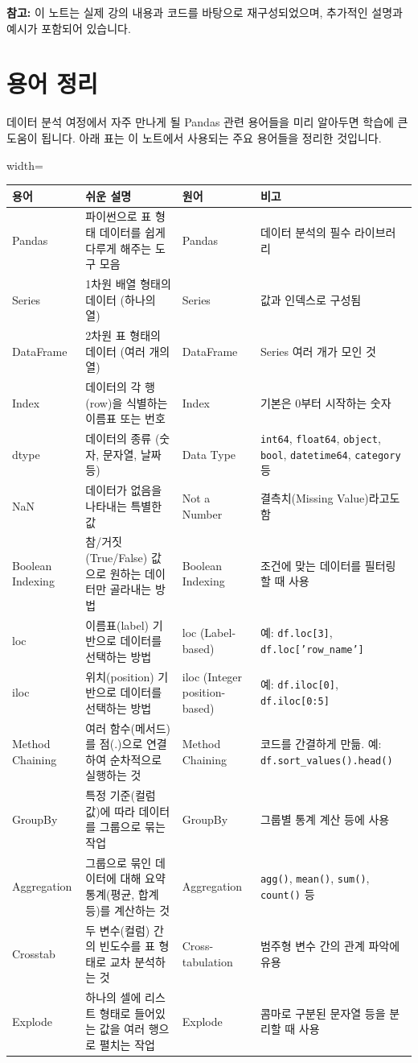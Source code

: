 \documentclass[11pt,a4paper]{book}
\theoremstyle{definition}
\begin{document}
\textbf{참고:} 이 노트는 실제 강의 내용과 코드를 바탕으로 재구성되었으며, 추가적인 설명과 예시가 포함되어 있습니다.


\section{용어 정리}

데이터 분석 여정에서 자주 만나게 될 Pandas 관련 용어들을 미리 알아두면 학습에 큰 도움이 됩니다. 아래 표는 이 노트에서 사용되는 주요 용어들을 정리한 것입니다.

\begin{adjustbox}{width=\textwidth}
\begin{tabular}{llll}
\toprule
\textbf{용어} & \textbf{쉬운 설명} & \textbf{원어} & \textbf{비고} \\
\midrule
Pandas & 파이썬으로 표 형태 데이터를 쉽게 다루게 해주는 도구 모음 & Pandas & 데이터 분석의 필수 라이브러리 \\
Series & 1차원 배열 형태의 데이터 (하나의 열) & Series & 값과 인덱스로 구성됨 \\
DataFrame & 2차원 표 형태의 데이터 (여러 개의 열) & DataFrame & Series 여러 개가 모인 것 \\
Index & 데이터의 각 행(row)을 식별하는 이름표 또는 번호 & Index & 기본은 0부터 시작하는 숫자 \\
dtype & 데이터의 종류 (숫자, 문자열, 날짜 등) & Data Type & \texttt{int64}, \texttt{float64}, \texttt{object}, \texttt{bool}, \texttt{datetime64}, \texttt{category} 등 \\
NaN & 데이터가 없음을 나타내는 특별한 값 & Not a Number & 결측치(Missing Value)라고도 함 \\
Boolean Indexing & 참/거짓(True/False) 값으로 원하는 데이터만 골라내는 방법 & Boolean Indexing & 조건에 맞는 데이터를 필터링할 때 사용 \\
loc & 이름표(label) 기반으로 데이터를 선택하는 방법 & loc (Label-based) & 예: \texttt{df.loc[3]}, \texttt{df.loc['row\_name']} \\
iloc & 위치(position) 기반으로 데이터를 선택하는 방법 & iloc (Integer position-based) & 예: \texttt{df.iloc[0]}, \texttt{df.iloc[0:5]} \\
Method Chaining & 여러 함수(메서드)를 점(.)으로 연결하여 순차적으로 실행하는 것 & Method Chaining & 코드를 간결하게 만듦. 예: \texttt{df.sort\_values().head()} \\
GroupBy & 특정 기준(컬럼 값)에 따라 데이터를 그룹으로 묶는 작업 & GroupBy & 그룹별 통계 계산 등에 사용 \\
Aggregation & 그룹으로 묶인 데이터에 대해 요약 통계(평균, 합계 등)를 계산하는 것 & Aggregation & \texttt{agg()}, \texttt{mean()}, \texttt{sum()}, \texttt{count()} 등 \\
Crosstab & 두 변수(컬럼) 간의 빈도수를 표 형태로 교차 분석하는 것 & Cross-tabulation & 범주형 변수 간의 관계 파악에 유용 \\
Explode & 하나의 셀에 리스트 형태로 들어있는 값을 여러 행으로 펼치는 작업 & Explode & 콤마로 구분된 문자열 등을 분리할 때 사용 \\
\bottomrule
\end{tabular}
\end{adjustbox}
\caption{Pandas 주요 용어 정리}
\label{tab:pandas_terms}
\end{document}
